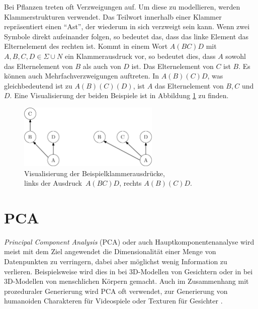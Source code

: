Bei Pflanzen treten oft Verzweigungen auf. Um diese zu modellieren, werden Klammerstrukturen verwendet. Das Teilwort innerhalb einer Klammer repräsentiert einen "`Ast"', der wiederum in sich verzweigt sein kann.
Wenn zwei Symbole direkt aufeinander folgen, so bedeutet das, dass das linke Element das Elternelement des rechten ist. Kommt in einem Wort $A(BC)D$ mit $A, B, C, D \in \Sigma \cup N$ ein Klammerausdruck vor, so bedeutet dies, dass $A$ sowohl das Elternelement von $B$ als auch von $D$ ist. Das Elternelement von $C$ ist $B$. Es können auch Mehrfachverzweigungen auftreten. In $A(B)(C)D$, was gleichbedeutend ist zu $A(B)(C)(D)$, ist $A$ das Elternelement von $B, C$ und $D$. Eine Visualisierung der beiden Beispiele ist in Abbildung \ref{branching_examples} zu finden. \cite[Kapitel 1]{AlgorithmicBeautyOfPlants}

\begin{figure}
 \centering
 \includegraphics[width=0.6\textwidth]{graphics/branchingExamples}
 \caption{Visualisierung der Beispielklammerausdrücke,\\ links der \mbox{Ausdruck $A(BC)D$}, rechts $A(B)(C)D$.}
 \label{branching_examples}
\end{figure}


\section{PCA} %
\label{PCA}
 
 \emph{Principal Component Analysis} (PCA) oder auch Hauptkomponentenanalyse \cite{PCA} wird meist mit dem Ziel angewendet die Dimensionalität einer Menge von Datenpunkten zu verringern, dabei aber möglichst wenig Information zu verlieren.
 Beispielsweise wird dies in \cite{PCA_faces} bei 3D-Modellen von Gesichtern oder in \cite{PCA_bodies} bei 3D-Modellen von menschlichen Körpern gemacht. Auch im Zusammenhang mit prozeduraler Generierung wird PCA oft verwendet, \zb zur Generierung von humanoiden Charakteren für Videospiele \cite{ProceduralCharacterGeneration} oder Texturen für Gesichter \cite{GeneratingFacialTextures}.
 
